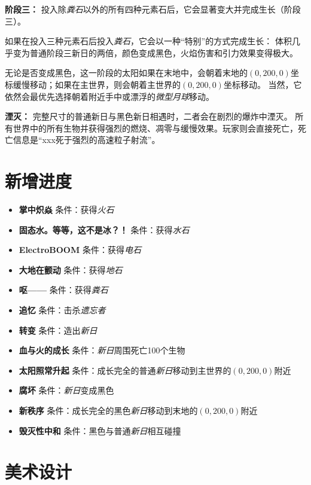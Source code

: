 \documentclass[11pt]{article}
\begin{document}
    \textbf{阶段三：}
    投入除\textit{粪石}以外的所有四种元素石后，它会显著变大并完成生长（阶段三）。

    如果在投入三种元素石后投入\textit{粪石}，它会以一种“特别”的方式完成生长：
    体积几乎变为普通阶段三新日的两倍，颜色变成黑色，火焰伤害和引力效果变得极大。

    无论是否变成黑色，这一阶段的太阳如果在末地中，会朝着末地的$(0, 200, 0)$坐标缓慢移动；如果在主世界，则会朝着主世界的$(0, 200, 0)$坐标移动。
    当然，它依然会最优先选择朝着附近手中或漂浮的\textit{微型月球}移动。

    \textbf{湮灭：}
    完整尺寸的普通新日与黑色新日相遇时，二者会在剧烈的爆炸中湮灭。
    所有世界中的所有生物并获得强烈的燃烧、凋零与缓慢效果。玩家则会直接死亡，死亡信息是“xxx死于强烈的高速粒子射流”。

    \clearpage
    \section{新增进度}\label{sec:achievements}
    \begin{itemize}
        \item \textbf{掌中炽焱} \quad 条件：获得\textit{火石}
        \item \textbf{固态水。等等，这不是冰？！} \quad 条件：获得\textit{水石}
        \item \textbf{ElectroBOOM} \quad 条件：获得\textit{电石}
        \item \textbf{大地在颤动} \quad 条件：获得\textit{地石}
        \item \textbf{呕——} \quad 条件：获得\textit{粪石}
        \item \textbf{追忆} \quad 条件：击杀\textit{遗忘者}
        \item \textbf{转变} \quad 条件：造出\textit{新日}
        \item \textbf{血与火的成长} \quad 条件：\textit{新日}周围死亡100个生物
        \item \textbf{太阳照常升起} \quad 条件：成长完全的普通\textit{新日}移动到主世界的$(0, 200, 0)$附近
        \item \textbf{腐坏} \quad 条件：\textit{新日}变成黑色
        \item \textbf{新秩序} \quad 条件：成长完全的黑色\textit{新日}移动到末地的$(0, 200, 0)$附近
        \item \textbf{毁灭性中和} \quad 条件：黑色与普通\textit{新日}相互碰撞
    \end{itemize}


    \clearpage
    \section{美术设计}\label{sec:artistic}
\end{document}
